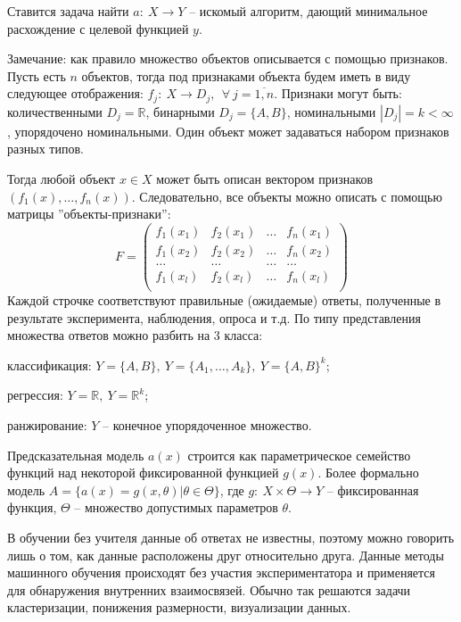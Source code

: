 Ставится задача найти $a:~X \rightarrow Y$ -- искомый алгоритм, дающий минимальное расхождение с целевой функцией $y$.

Замечание: как правило множество объектов описывается с помощью признаков. Пусть есть $n$ объектов, тогда под признаками объекта будем иметь в виду следующее отображения: $f_j:~X \rightarrow D_j,~~\forall~j=\overline{1,n}$.
Признаки могут быть: количественными $D_j=\mathbb{R}$, бинарными $D_j=\{A, B\}$, номинальными $|D_j|=k<\infty$, упорядочено номинальными. Один объект может задаваться набором признаков разных типов.

Тогда любой объект $x \in X$ может быть описан вектором признаков $(f_1(x), \dots, f_n(x))$.
Следовательно, все объекты можно описать с помощью матрицы ''объекты-признаки'':
$$ F = 
\begin{pmatrix}
f_1(x_1) & f_2(x_1) & \dots & f_n(x_1) \\
f_1(x_2) & f_2(x_2) & \dots & f_n(x_2) \\
\dots    & \dots    & \dots & \dots    \\
f_1(x_l) & f_2(x_l) & \dots & f_n(x_l) \\
\end{pmatrix}
$$
Каждой строчке соответствуют правильные (ожидаемые) ответы, полученные в результате эксперимента, наблюдения, опроса и т.д. По типу представления множества ответов можно разбить на 3 класса:
\begin{description}[font=$\bullet$]
    \item классификация: $Y=\{A,B\},~Y=\{A_1,\dots,A_k\},~Y=\{A,B\}^k$;
    \item регрессия: $Y=\mathbb{R},~Y=\mathbb{R}^k$;
    \item ранжирование: $Y$ -- конечное упорядоченное множество.
\end{description}

Предсказательная модель $a(x)$ строится как параметрическое семейство функций над некоторой фиксированной функцией $g(x)$. Более формально модель $A = \{ a(x) = g(x,\theta) | \theta \in \Theta \}$, где $g:~X \times \Theta \rightarrow Y$ -- фиксированная функция, $\Theta$ -- множество допустимых параметров $\theta$.


В обучении без учителя данные об ответах не известны, поэтому можно говорить лишь о том, как данные расположены друг относительно друга. Данные методы машинного обучения происходят без участия экспериментатора и применяется для обнаружения внутренних взаимосвязей. Обычно так решаются задачи кластеризации, понижения размерности, визуализации данных.

